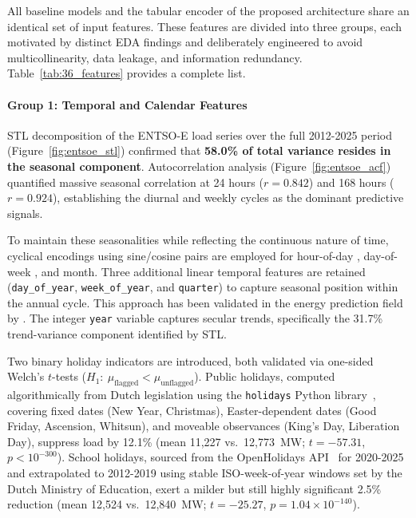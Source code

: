 All baseline models and the tabular encoder of the proposed architecture share an identical set of input features. These features are divided into three groups, each motivated by distinct EDA findings and deliberately engineered to avoid multicollinearity, data leakage, and information redundancy. Table~\ref{tab:36_features} provides a complete list.

\paragraph{Group 1: Temporal and Calendar Features}
\label{par:temporal_features}

STL decomposition of the ENTSO-E load series over the full 2012-2025 period (Figure~\ref{fig:entsoe_stl}) confirmed that \textbf{58.0\% of total variance resides in the seasonal component}. Autocorrelation analysis (Figure~\ref{fig:entsoe_acf}) quantified massive seasonal correlation at 24 hours ($r = 0.842$) and 168 hours ($r = 0.924$), establishing the diurnal and weekly cycles as the dominant predictive signals.

To maintain these seasonalities while reflecting the continuous nature of time, cyclical encodings using sine/cosine pairs are employed for hour-of-day , day-of-week , and month. Three additional linear temporal features are retained (\texttt{day\_of\_year}, \texttt{week\_of\_year}, and \texttt{quarter}) to capture seasonal position within the annual cycle. This approach has been validated in the energy prediction field by \cite{khazem2025cyclical}. The integer \texttt{year} variable captures secular trends, specifically the 31.7\% trend-variance component identified by STL.

Two binary holiday indicators are introduced, both validated via one-sided Welch's $t$-tests ($H_1{:}\ \mu_{\text{flagged}} < \mu_{\text{unflagged}}$). Public holidays, computed algorithmically from Dutch legislation using the \texttt{holidays} Python library~\cite{holidays_python}, covering fixed dates (New Year, Christmas), Easter-dependent dates (Good Friday, Ascension, Whitsun), and moveable observances (King's Day, Liberation Day), suppress load by 12.1\% (mean 11,227 vs.\ 12,773~MW; $t = -57.31$, $p < 10^{-300}$). School holidays, sourced from the OpenHolidays API~\cite{openholidays_api} for 2020-2025 and extrapolated to 2012-2019 using stable ISO-week-of-year windows set by the Dutch Ministry of Education, exert a milder but still highly significant 2.5\% reduction (mean 12,524 vs.\ 12,840~MW; $t = -25.27$, $p = 1.04 \times 10^{-140}$).

